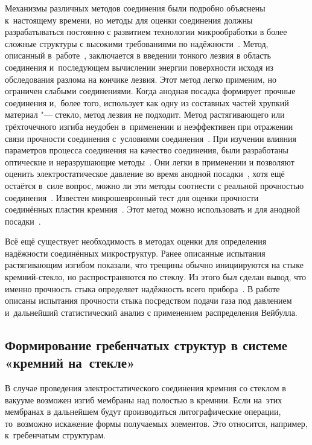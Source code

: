 Механизмы различных методов соединения были подробно объяснены к~настоящему времени, но методы для оценки соединения должны разрабатываться постоянно с развитием технологии микрообработки в более сложные структуры с высокими требованиями по надёжности~\cite{Richard2002weibull_fracture_probability}. Метод, описанный в~работе~\cite{Maszara1988bonding_silicon}, заключается в введении тонкого лезвия в область соединения и~последующем вычислении энергии поверхности исходя из обследования разлома на кончике лезвия. Этот метод легко применим, но ограничен слабыми соединениями. Когда анодная посадка формирует прочные соединения и,~более того, использует как одну из составных частей хрупкий материал "--- стекло, метод лезвия не подходит. Метод растягивающего или трёхточечного изгиба неудобен в~применении и неэффективен при отражении связи прочности соединения с~условиями соединения~\cite{Richard2002weibull_fracture_probability}. При изучении влияния параметров процесса соединения на качество соединения, были разработаны оптические и неразрушающие методы~\cite{Go1999Experimental_eval_Taguchi, TaticLucic1997bond_characterization, Plaza1997nondestructive}. Они легки в применении и позволяют оценить электростатическое давление во время анодной посадки~\cite{Richard2002weibull_fracture_probability}, хотя ещё остаётся в~силе вопрос, можно ли эти методы соотнести с реальной прочностью соединения~\cite{TaticLucic1997bond_characterization}. Известен микрошевронный тест для оценки прочности соединённых пластин кремния~\cite{Petzold1999quality_reliability_chevron}. Этот метод можно использовать и для анодной посадки~\cite{Richard2002weibull_fracture_probability}.

Всё ещё существует необходимость в методах оценки для определения надёжности соединённых микроструктур. Ранее описанные испытания растягивающим изгибом показали, что трещины обычно инициируются на стыке кремний-стекло, но распространяются по стеклу. Из этого был сделан вывод, что именно прочность стыка определяет надёжность всего прибора~\cite{Richard2002weibull_fracture_probability}. В работе~\cite{Richard2002weibull_fracture_probability} описаны испытания прочности стыка посредством подачи газа под давлением и~дальнейший статистический анализ с применением распределения Вейбулла.

\subsection{Формирование гребенчатых структур в системе «кремний на~стекле»}
В случае проведения электростатического соединения кремния со стеклом в вакууме возможен изгиб мембраны над полостью в кремнии. Если на~этих мембранах в дальнейшем будут производиться литографические операции, то~возможно искажение формы получаемых элементов. Это относится, например, к~гребенчатым структурам.

